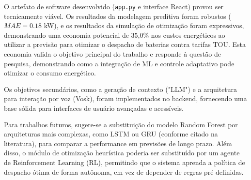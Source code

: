 \documentclass[conference]{IEEEtran}
\begin{document}
O artefato de software desenvolvido (\texttt{app.py} e interface React) provou ser tecnicamente viável. Os resultados da modelagem preditiva foram robustos ($MAE = 0.18$ kW), e os resultados da simulação de otimização foram expressivos, demonstrando uma economia potencial de 35,0\% nos custos energéticos ao utilizar a previsão para otimizar o despacho de baterias contra tarifas TOU. Esta economia valida o objetivo principal do trabalho e responde à questão de pesquisa, demonstrando como a integração de ML e controle adaptativo pode otimizar o consumo energético.

Os objetivos secundários, como a geração de contexto ("LLM") e a arquitetura para interação por voz (Vosk), foram implementados no backend, fornecendo uma base sólida para interfaces de usuário avançadas e acessíveis.

Para trabalhos futuros, sugere-se a substituição do modelo Random Forest por arquiteturas mais complexas, como LSTM ou GRU (conforme citado na literatura), para comparar a performance em previsões de longo prazo. Além disso, o módulo de otimização heurística poderia ser substituído por um agente de Reinforcement Learning (RL), permitindo que o sistema aprenda a política de despacho ótima de forma autônoma, em vez de depender de regras pré-definidas.
\end{document}
